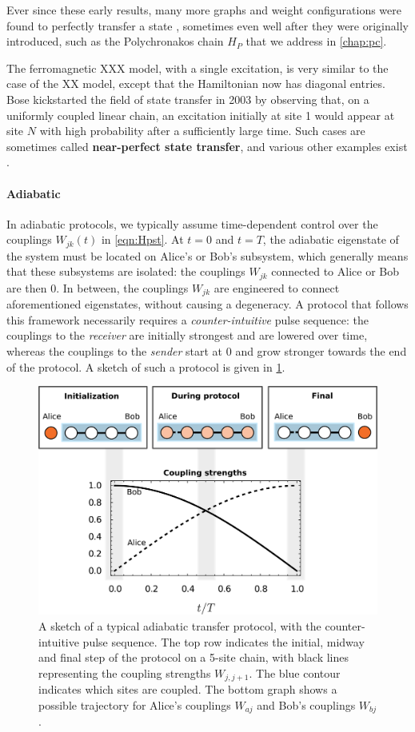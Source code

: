Ever since these early results, many more graphs and weight configurations were found to perfectly transfer a state \cite{Kay2010a,Godsil2012}, sometimes even well after they were originally introduced, such as the Polychronakos chain $H_P$ that we address in \cref{chap:pc}. 

The ferromagnetic XXX model, with a single excitation, is very similar to the case of the XX model, except that the Hamiltonian now has diagonal entries. Bose kickstarted the field of state transfer in 2003 \cite{Bose2003}  by observing that, on a uniformly coupled linear chain, an excitation initially at site 1 would appear at site $N$ with high probability after a sufficiently large time. Such cases are sometimes called \textbf{near-perfect state transfer}, and various other examples exist \cite{Godsil2012a,Vinet2012,Banchi2017}.

\paragraph{Adiabatic} 
In adiabatic protocols, we typically assume time-dependent control over the couplings $W_{jk}(t)$ in \cref{eqn:Hpst}. At $t=0$ and $t=T$, the adiabatic eigenstate of the system must be located on Alice's or Bob's subsystem, which generally means that these subsystems are isolated: the couplings $W_{jk}$ connected to Alice or Bob are then $0$. In between, the couplings $W_{jk}$ are engineered to connect aforementioned eigenstates, without causing a degeneracy. A protocol that follows this framework necessarily requires a \emph{counter-intuitive} pulse sequence: the couplings to the \emph{receiver} are initially strongest and are lowered over time, whereas the couplings to the \emph{sender} start at $0$ and grow stronger towards the end of the protocol. A sketch of such a protocol is given in \cref{fig:adiabatic_protocol_sketch}. 

\begin{figure}
\begin{center}
\includegraphics[width=.7\textwidth]{./img/adiabatic_protocol_sketch_v2.pdf} 
\end{center}
\caption{A sketch of a typical adiabatic transfer protocol, with the counter-intuitive pulse sequence. The top row indicates the initial, midway and final step of the protocol on a 5-site chain, with black lines representing the  coupling strengths $W_{j,j+1}$. The blue contour indicates which sites are coupled. The bottom graph shows a possible trajectory for Alice's couplings $W_{aj}$ and Bob's couplings $W_{bj}$.  }
\label{fig:adiabatic_protocol_sketch}
\end{figure}


